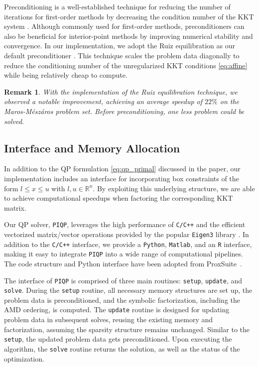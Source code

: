 \documentclass[letterpaper, 10 pt, conference]{ieeeconf}  \IEEEoverridecommandlockouts
\newtheorem{remark}{Remark}
\begin{document}
Preconditioning is a well-established technique for reducing the number of iterations for first-order methods by decreasing the condition number of the KKT system \cite[Chapter~5]{nocedal2006}. Although commonly used for first-order methods, preconditioners can also be beneficial for interior-point methods by improving numerical stability and convergence. In our implementation, we adopt the Ruiz equilibration as our default preconditioner \cite{ruiz2001}. This technique scales the problem data diagonally to reduce the conditioning number of the unregularized KKT conditions \eqref{eq:affine} while being relatively cheap to compute.

\begin{remark}
With the implementation of the Ruiz equilibration technique, we observed a notable improvement, achieving an average speedup of $22\%$ on the Maros-Mészáros problem set. Before preconditioning, one less problem could be solved.
\end{remark}

\subsection{Interface and Memory Allocation} \label{subsec:interface}

In addition to the QP formulation \eqref{eq:qp_primal} discussed in the paper, our implementation includes an interface for incorporating box constraints of the form $l \leq x \leq u$ with $l, u \in \mathbb{R}^n$. By exploiting this underlying structure, we are able to achieve computational speedups when factoring the corresponding KKT matrix.

Our QP solver, \texttt{PIQP}, leverages the high performance of \texttt{C/C++} and the efficient vectorized matrix/vector operations provided by the popular \texttt{Eigen3} library \cite{eigenweb}. In addition to the \texttt{C/C++} interface, we provide a \texttt{Python}, \texttt{Matlab}, and an \texttt{R} interface, making it easy to integrate \texttt{PIQP} into a wide range of computational pipelines. The code structure and Python interface have been adopted from ProxSuite~\cite{bambade2022}.

The interface of \texttt{PIQP} is comprised of three main routines: \texttt{setup}, \texttt{update}, and \texttt{solve}. During the \texttt{setup} routine, all necessary memory structures are set up, the problem data is preconditioned, and the symbolic factorization, including the AMD ordering, is computed. The \texttt{update} routine is designed for updating problem data in subsequent solves, reusing the existing memory and factorization, assuming the sparsity structure remains unchanged. Similar to the \texttt{setup}, the updated problem data gets preconditioned. Upon executing the algorithm, the \texttt{solve} routine returns the solution, as well as the status of the optimization.
\end{document}
